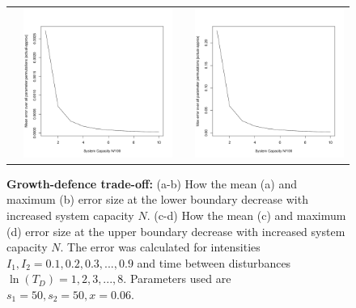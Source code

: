 \documentclass[preprint,10pt,reqno]{amsart}
\begin{document}
\begin{figure}[th]
\begin{tabular}{rrrr}
  &\includegraphics[width=2.5in]{GDtmeanerr.pdf} && \includegraphics[width=2.5in]{GDtmaxerr.pdf} \end{tabular}
  \label{{fig:gdtoapprox}}
   \caption{\textbf{Growth-defence trade-off:} (a-b)  How the mean (a) and maximum (b) error size at the lower boundary decrease with increased system capacity $N$. (c-d) How the mean (c) and maximum (d) error size at the upper boundary decrease with increased system capacity $N$. The error was calculated for intensities $I_1,I_2=0.1,0.2,0.3,...,0.9$ and time between disturbances $\ln(T_D)=1,2,3,...,8.$ Parameters used are $s_1=50,s_2=50,x=0.06$.}
    \end{figure}
\end{document}
